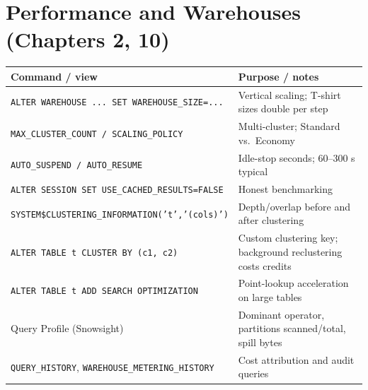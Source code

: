 \section{Performance and Warehouses (Chapters 2, 10)}
\begin{center}
\footnotesize
\begin{tabular}{@{}p{5.6cm}p{8.6cm}@{}}
\toprule
\textbf{Command / view} & \textbf{Purpose / notes} \\
\midrule
\texttt{ALTER WAREHOUSE ... SET WAREHOUSE\_SIZE=...} & Vertical scaling; T-shirt sizes double per step \\
\texttt{MAX\_CLUSTER\_COUNT / SCALING\_POLICY} & Multi-cluster; Standard vs.\ Economy \\
\texttt{AUTO\_SUSPEND / AUTO\_RESUME} & Idle-stop seconds; 60--300 s typical \\
\texttt{ALTER SESSION SET USE\_CACHED\_RESULTS=FALSE} & Honest benchmarking \\
\texttt{SYSTEM\$CLUSTERING\_INFORMATION('t','(cols)')} & Depth/overlap before and after clustering \\
\texttt{ALTER TABLE t CLUSTER BY (c1, c2)} & Custom clustering key; background reclustering costs credits \\
\texttt{ALTER TABLE t ADD SEARCH OPTIMIZATION} & Point-lookup acceleration on large tables \\
Query Profile (Snowsight) & Dominant operator, partitions scanned/total, spill bytes \\
\texttt{QUERY\_HISTORY}, \texttt{WAREHOUSE\_METERING\_HISTORY} & Cost attribution and audit queries \\
\bottomrule
\end{tabular}
\end{center}

